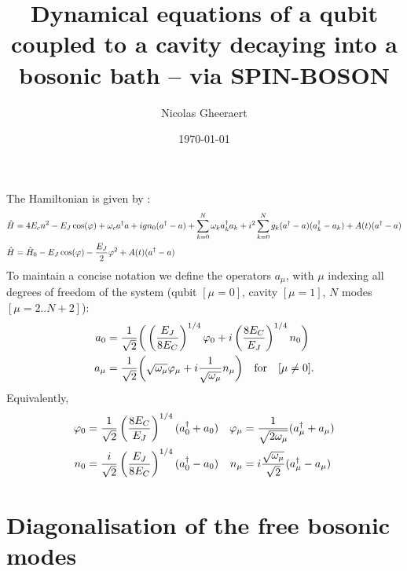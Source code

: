\documentclass[prb]{revtex4}
\newcommand{\eq}[1]{\begin{align}#1\end{align}}
\begin{document}
\title{Dynamical equations of a qubit coupled to a cavity decaying into a bosonic bath -- via SPIN-BOSON}
\author{Nicolas Gheeraert}
\date{\today}
\maketitle
The Hamiltonian is given by :
%
\eq{
\hat H &= 4 E_c n^2 -E_J \cos(\varphi) + \omega_c a^\dag a  + ig n_0 ( a^\dag- a ) + \sum_{k=0}^{N} \omega_k a_k^\dag a_k + i^2 \sum_{k=0}^{N} g_k ( a^\dag - a   ) (a_k^\dag - a_k) + A(t) (a^\dag- a) \notag \\
\hat H &= \hat H_0  -E_J \cos(\varphi)  -\frac{E_J}{2} \varphi^2 + A(t) (a^\dag- a) 
}
To maintain a concise notation we define the operators $a_\mu$, with $\mu$ indexing all degrees of freedom of the system (qubit $[\mu=0]$, cavity $[\mu=1]$, $N$ modes $[\mu=2..N+2]$):
\eq{
a_0 &= \frac{1}{\sqrt{2}}\bigg( \left(\frac{E_J}{8 E_C}\right)^{1/4} \varphi_0 + i \left(\frac{8 E_C}{E_J}\right)^{1/4}  n_0 \bigg) \notag \\
a_\mu &= \frac{1}{\sqrt{2}}\bigg( \sqrt{\omega_\mu} \varphi_\mu + i \frac{1}{\sqrt{\omega_\mu} } n_\mu \bigg)\quad \text{for} \quad [\mu \ne 0].
}
Equivalently,
\eq{
\varphi_0 &= \frac{1}{\sqrt{2}}\left( \frac{8E_C}{E_J} \right)^{1/4} ( a_0^\dag + a_0 ) &\varphi_\mu &= \frac{1}{\sqrt{2\omega_\mu}} ( a_\mu^\dag + a_\mu )\notag \\
 n_0 &= \frac{i}{\sqrt{2}}\left( \frac{E_J}{8E_C} \right)^{1/4}  ( a_0^\dag - a_0 ) & n_\mu &= i\frac{\sqrt{\omega_\mu}}{\sqrt{2}} ( a_\mu^\dag - a_\mu ) 
}

\section{ Diagonalisation of the free bosonic modes }
\end{document}

